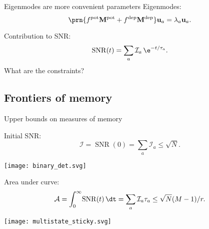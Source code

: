 \documentclass[final]{beamer}%
\DeclareMathOperator{\snr}{SNR}
\newcommand{\M}{\mathbf{M}}
\newcommand{\pot}{^{\text{pot}}}
\newcommand{\dep}{^{\text{dep}}}
\newcommand{\initial}{\mathcal{I}}
\newcommand{\area}{\mathcal{A}}
\begin{document}

\begin{frame}{Eigenmodes are more convenient parameters}
%
 Eigenmodes:
 \begin{equation*}
   \prn{f\pot\M\pot+f\dep\M\dep} \mathbf{u}_a = \lambda_a \mathbf{u}_a.
 \end{equation*}
%

 \vp Contribution to SNR:
 \begin{equation*}
   \snr(t) = \sum_a \mathcal{I}_a \, \e^{-t/\tau_a}.
 \end{equation*}
%
 What are the constraints?
%
\end{frame}



\subsection{Frontiers of memory}


\begin{frame}{Upper bounds on measures of memory}
%
\parbox[t]{0.6\linewidth}{
 Initial SNR:
 \begin{equation*}
   \initial = \snr(0) = \sum_a \initial_a \leq \sqrt{N}.
 \end{equation*}
 \begin{center}
   \texttt{[image: binary\_det.svg]}
 \end{center}
 }
 \parbox[t]{0.39\linewidth}{
 } \par
 Area under curve:
 \begin{equation*}
   \area = \int_0^\infty \!\snr(t)\, \dt = \sum_a \initial_a \tau_a \leq \sqrt{N}(M-1)/r.
 \end{equation*}
 \begin{center}
   \texttt{[image: multistate\_sticky.svg]}
 \end{center}
%
\end{frame}

\end{document}
